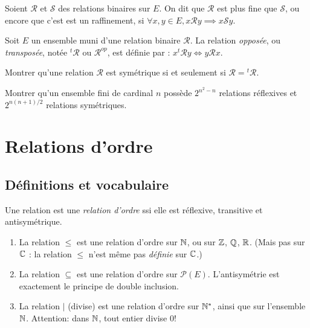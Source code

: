 \begin{definition}
Soient $\mathcal R$ et $\mathcal S$ des relations binaires sur $E$. On dit que $\mathcal R$ est plus fine que $\mathcal S$, ou encore que c'est est un raffinement, si $\forall x, y\in E, x\mathcal R y \implies x\mathcal S y$. 
\end{definition}

\begin{definition}
Soit $E$ un ensemble muni d'une relation binaire $\mathcal R$. La relation \emph{opposée}, ou \emph{transposée}, notée ${}^t\mathcal R$ ou $\mathcal R^{op}$, est définie par : $x{}^t\mathcal R y \iff y\mathcal R x$. 
\end{definition}

\begin{exercice}
Montrer qu'une relation $\mathcal R$ est symétrique si et seulement si $\mathcal R = {}^t\mathcal R$.
\end{exercice}
\begin{exercice}
Montrer qu'un ensemble fini de cardinal $n$ possède $2^{n^2-n}$ relations réflexives et $2^{n(n+1)/2}$ relations symétriques.
\end{exercice}

\section{Relations d'ordre}

\subsection{Définitions et vocabulaire}


\begin{definition}
Une relation est une \emph{relation d'ordre} ssi elle est réflexive, transitive et antisymétrique.
\end{definition}

\begin{exemples}
\begin{enumerate}[label=\alph*)]
\item La relation $\leq$ est une relation d'ordre sur $\mathbb{N}$, ou sur $\mathbb{Z}$, $\mathbb{Q}$, $\mathbb{R}$. (Mais pas sur $\mathbb{C}$ : la relation $\leq$ n'est même pas \emph{définie} sur $\mathbb{C}$.)
\item La relation $\subseteq$ est une relation d'ordre sur $\mathcal P(E)$. L'antisymétrie est exactement le principe de double inclusion.
\item La relation $|$ (\og divise\fg) est une relation d'ordre sur $\mathbb{N}^*$, ainsi que sur l'ensemble $\mathbb{N}$. Attention: dans $\mathbb{N}$, tout entier divise $0$! 
\end{enumerate}
\end{exemples}

